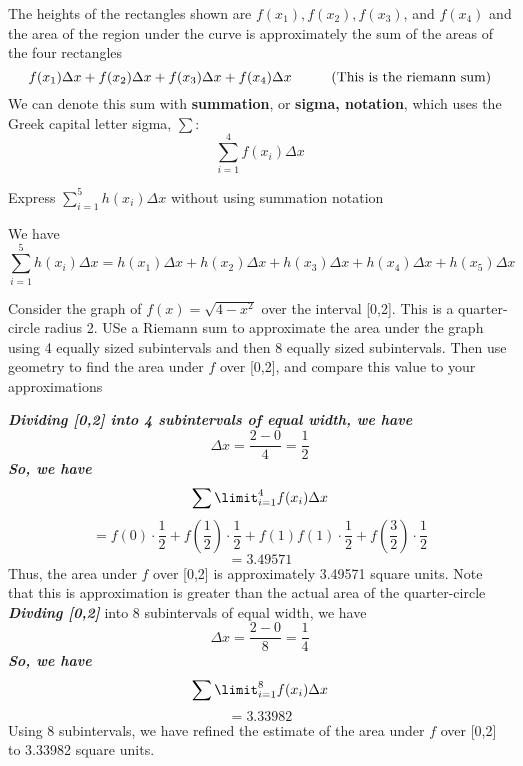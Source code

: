 \documentclass{report}
\begin{document}
\pagebreak \noindent
The heights of the rectangles shown are $f(x_1), f(x_2), f(x_3)$, and $ f(x_4)$ and the area of the region under the curve is approximately the sum of the areas of the four rectangles
$$ f(x_1) \Delta{x} + f(x_2) \Delta{x} + f(x_3) \Delta{x} + f(x_4) \Delta{x} \hspace{10mm} \text{(This is the riemann sum)}$$
We can denote this sum with \textbf{summation}, or \textbf{sigma, notation}, which uses the Greek capital letter sigma, $\sum$:
$$\sum\limits_{i=1}^{4}f(x_i)\Delta{x}$$
\begin{mdframed}
\q
Express $\sum\limits_{i=1}^5h(x_i)\Delta{x}$ without using summation notation
\vspace{1mm}
\end{mdframed}
\sol We have
$$ \sum_{i=1}^5 h\left(x_i\right) \Delta x=h\left(x_1\right) \Delta x+h\left(x_2\right) \Delta x+h\left(x_3\right) \Delta x+h\left(x_4\right) \Delta x+h\left(x_5\right) \Delta x $$
\begin{mdframed}
\q
Consider the graph of $f(x) = \sqrt{4-x^2}$ over the interval [0,2]. This is a quarter-circle radius 2. USe a Riemann sum to approximate the area under the graph using 4 equally sized subintervals and then 8 equally sized subintervals. Then use geometry to find the area under $f$ over [0,2], and compare this value to your approximations
\vspace{1mm}
\end{mdframed}
\sol 
\bigbreak \noindent
\textit{\textbf{Dividing [0,2] into 4 subintervals of equal width, we have}}
$$\Delta{x} = \dfrac{2-0}{4} = \dfrac{1}{2}$$
\textit{\textbf{So, we have}}
$$ \sum\limit_{i=1}^4f(x_i)\Delta{x}$$
$$ = f(0)\cdot{\frac{1}{2}} + f\left(\frac{1}{2}\right) \cdot \frac{1}{2} + f(1) f\left(1\right) \cdot \frac{1}{2} + f\left(\frac{3}{2}\right)\cdot \frac{1}{2}$$
$$ = 3.49571$$
Thus, the area under $f$ over [0,2] is approximately 3.49571 square units. Note that this is approximation is greater than the actual area of the quarter-circle
\bigbreak \noindent
\textit{\textbf{Divding [0,2]}} into 8 subintervals of equal width, we have
$$\Delta{x} = \dfrac{2-0}{8} = \dfrac{1}{4}$$
\textit{\textbf{So, we have}}
$$\sum\limit_{i=1}^8f(x_i)\Delta{x}$$
$$ = 3.33982$$
Using 8 subintervals, we have refined the estimate of the area under $f$ over [0,2] to 3.33982 square units.

\pagebreak \noindent
\end{document}
